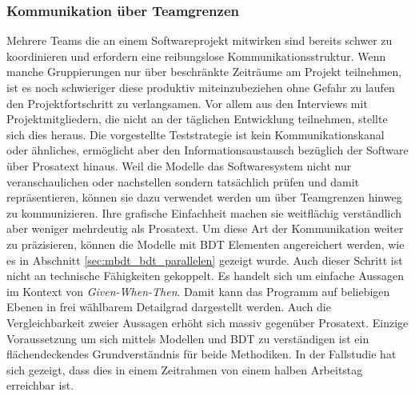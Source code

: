 \subsubsection{Kommunikation über Teamgrenzen}
Mehrere Teams die an einem Softwareprojekt mitwirken sind bereits schwer zu koordinieren und erfordern eine reibungslose Kommunikationsstruktur. Wenn manche Gruppierungen nur über beschränkte Zeiträume am Projekt teilnehmen, ist es noch schwieriger diese produktiv miteinzubeziehen ohne Gefahr zu laufen den Projektfortschritt zu verlangsamen. Vor allem aus den Interviews mit Projektmitgliedern, die nicht an der täglichen Entwicklung teilnehmen, stellte sich dies heraus. Die vorgestellte Teststrategie ist kein Kommunikationskanal oder ähnliches, ermöglicht aber den Informationsaustausch bezüglich der Software über Prosatext hinaus. Weil die Modelle das Softwaresystem nicht nur veranschaulichen oder nachstellen sondern tatsächlich prüfen und damit repräsentieren, können sie dazu verwendet werden um über Teamgrenzen hinweg zu kommunizieren. Ihre grafische Einfachheit machen sie weitflächig verständlich aber weniger mehrdeutig als Prosatext. Um diese Art der Kommunikation weiter zu präzisieren, können die Modelle mit \Gls{BDT} Elementen angereichert werden, wie es in Abschnitt \ref{sec:mbdt_bdt_parallelen} gezeigt wurde. Auch dieser Schritt ist nicht an technische Fähigkeiten gekoppelt. Es handelt sich um einfache Aussagen im Kontext von \textit{Given-When-Then}. Damit kann das Programm auf beliebigen Ebenen in frei wählbarem Detailgrad dargestellt werden. Auch die Vergleichbarkeit zweier Aussagen erhöht sich massiv gegenüber Prosatext. Einzige Voraussetzung um sich mittels Modellen und BDT zu verständigen ist ein flächendeckendes Grundverständnis für beide Methodiken. In der Fallstudie hat sich gezeigt, dass dies in einem Zeitrahmen von einem halben Arbeitstag erreichbar ist.

